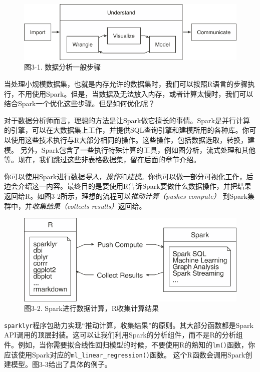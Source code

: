 \documentclass[
]{article}
\begin{document}
\begin{figure}
\centering
\includegraphics{figures/3_1.png}
\caption{图3-1. 数据分析一般步骤}
\end{figure}

当处理小规模数据集，也就是内存允许的数据集时，我们可以按照R语言的步骤执行，不用使用Spark。但是，当数据及无法放入内存，或者计算太慢时，我们可以结合Spark一个优化这些步骤。但是如何优化呢？

对于数据分析师而言，理想的方法是让Spark做它擅长的事情。Spark是并行计算的引擎，可以在大数据集上工作，并提供SQL查询引擎和建模所用的各种库。你可以使用这些技术执行与R大部分相同的操作。这些操作，包括数据选取，转换，建模。
另外，Spark包含了一些执行特殊计算的工具，例如图分析，流式处理和其他等。现在，我们跳过这些非表格数据集，留在后面的章节介绍。

你可以使用Spark进行数据\emph{导入}，\emph{操作}和\emph{建模}。你也可以做一部分可视化工作，后边会介绍这一内容。最终目的是要使用R告诉Spark要做什么数据操作，并把结果返回给R。如图3-2所示，理想的流程可以\emph{推动计算（pushes
compute）} 到Spark集群中，并\emph{收集结果（collects results）}返回给。

\begin{figure}
\centering
\includegraphics{figures/3_2.png}
\caption{图3-2. Spark进行数据计算，R收集计算结果}
\end{figure}

\texttt{sparklyr}程序包助力实现``推动计算，收集结果''的原则。其大部分函数都是Spark
API调用的顶层封装。这可以让我们利用Spark的分析组件，而不是R的分析组件。例如，当你需要拟合线性回归模型的时候，不要使用R的熟知的\texttt{lm()}函数，你应该使用Spark对应的\texttt{ml\_linear\_regression()}函数。
这个R函数会调用Spark创建模型。图3-3给出了具体的例子。
\end{document}
